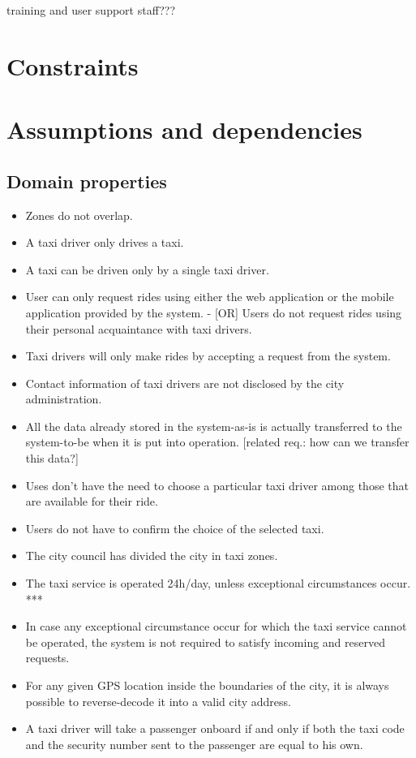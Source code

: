 training and user support staff???

\section{Constraints}

\section{Assumptions and dependencies}
\subsection{Domain properties}
\begin{itemize}
\item Zones do not overlap.
\item A taxi driver only drives a taxi.
\item A taxi can be driven only by a single taxi driver.
\item User can only request rides using either the web application or the mobile application provided by the system.
- [OR] Users do not request rides using their personal acquaintance with taxi drivers.
\item Taxi drivers will only make rides by accepting a request from the system.
\item Contact information of taxi drivers are not disclosed by the city administration.
\item All the data already stored in the system-as-is is actually transferred to the system-to-be when it is put into operation. [related req.: how can we transfer this data?]
\item Uses don't have the need to choose a particular taxi driver among those that are available for their ride.
\item Users do not have to confirm the choice of the selected taxi.
\item The city council has divided the city in taxi zones.
\item The taxi service is operated 24h/day, unless exceptional circumstances occur. ***
\item In case any exceptional circumstance occur for which the taxi service cannot be operated, the system is not required to satisfy incoming and reserved requests. 
\item For any given GPS location inside the boundaries of the city, it is always possible to reverse-decode it into a valid city address. 
\item A taxi driver will take a passenger onboard if and only if both the taxi code and the security number sent to the passenger are equal to his own. 


\end{itemize}
